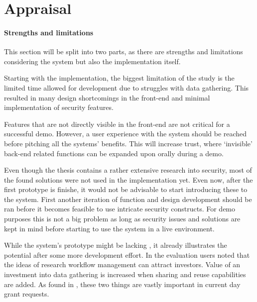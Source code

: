 \section{Appraisal}


\paragraph{Strengths and limitations}
This section will be split into two parts, as there are strengths and limitations considering the system but also the implementation itself.

Starting with the implementation, the biggest limitation of the study is the limited time allowed for development due to struggles with data gathering.
This resulted in many design shortcomings in the front-end and minimal implementation of security features.

Features that are not directly visible in the front-end are not critical for a successful demo.
However, a  user experience with the system should be reached before pitching all the systems' benefits.
This will increase trust, where `invisible' back-end related functions can be expanded upon orally during a demo.

Even though the thesis contains a rather extensive research into security, most of the found solutions were not used in the \ivfsystem{}implementation yet.
Even now, after the first prototype is finishe, it would not be advisable to start introducing these to the system.
First another iteration of function and design development should be ran before it becomes feasible to use intricate security constructs.
For demo purposes this is not a big problem as long as security issues and solutions are kept in mind before starting to use the system in a live environment.

While the system's prototype might be lacking , it already illustrates the potential after some more development effort.
In the evaluation users noted that the ideas of research workflow management can attract investors. 
Value of an investment into data gathering is increased when sharing and reuse capabilities are added.
As found in ,  these two things are vastly important in current day grant requests.

